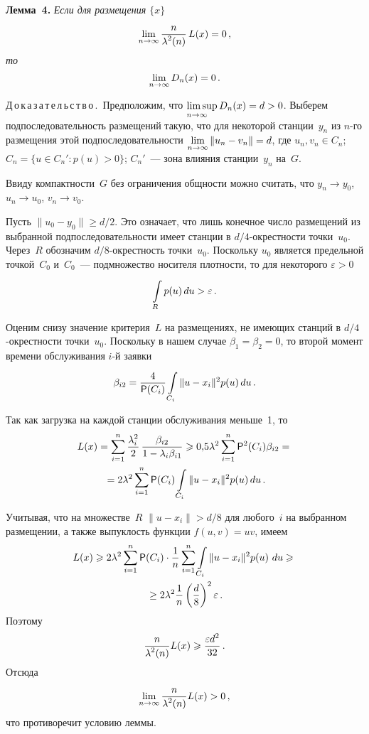 \begin{multicols}{2}
\medskip

\noindent
\textbf{Лемма~4.} \textit{Если для размещения $\{x\}$}
$$
\lim\limits_{n\rightarrow\infty} \displaystyle\frac{\displaystyle n\mathstrut}{\displaystyle \lambda^2(n)\mathstrut}\,L(x)=0\,,
$$ 
\textit{то}
$$
\lim\limits_{n\rightarrow\infty} D_n(x)=0\,.
$$

\smallskip

\noindent
Д\,о\,к\,а\,з\,а\,т\,е\,л\,ь\,с\,т\,в\,о\,.\ 
Предположим, что $\limsup\limits_{n \to \infty~~~} D_n(x)=d>0$. Выберем подпоследовательность размещений такую, 
что для некоторой станции~$y_n$ из $n$-го
размещения этой подпоследовательности $\lim\limits_{n\to\infty} \|u_n-v_n\|=d$, где $u_n, v_n \in C_n$;
$C_n=\{u\in C_n' : p(u)>0 \}$; $C_n'$~--- зона влияния станции~$y_n$ на~$G$.

Ввиду компактности~$G$ без ограничения общ\-ности можно считать, что $y_n \to y_0$, $u_n \to u_0$,
$v_n \to v_0 $.

Пусть $\|u_0 - y_0\|\geqslant d/2$. Это означает, что лишь конечное число размещений из
выбранной подпоследовательности имеет станции в $d/4$-окрестности точки~$u_0$. Через~$R$
обозначим $d/8$-окрестность точки~$u_0$.
%
Поскольку $u_0$ является предельной точкой~$C_0$ и~$C_0$~--- подмножество носителя плотности,
то для некоторого $\varepsilon>0$ 
$$
\int\limits_{R}^{}p(u)\,du > \varepsilon\,.
$$

Оценим снизу значение критерия~$L$ на размещениях, не имеющих станций в $d/4$-окрест\-ности
точки~$u_0$.
%
Поскольку в нашем случае $\beta_1=\beta_2=0$, то второй момент времени обслуживания $i$-й заявки 
$$
\beta_{i2}=\displaystyle\frac{\displaystyle 4\mathstrut}{\displaystyle {{\sf P}} (C_i)\mathstrut}\int\limits_{C_i}^{}\|u-x_i\|^2 p(u)\,du\,.
$$

Так как загрузка на каждой станции обслуживания меньше~1, то
\begin{multline*}
L(x)=\sum\limits_{i=1}^{n}\displaystyle\frac{\displaystyle \lambda_i^2\mathstrut}{\displaystyle 2\mathstrut} \,\displaystyle\frac{\displaystyle \beta_{i2}\mathstrut}{\displaystyle 1-\lambda_i \beta_{i1}\mathstrut}\geqslant
0{,}5\lambda^2\sum\limits_{i=1}^{n} {{\sf P}}^2(C_i)\beta_{i2}={}\\
{}=2\lambda^2\sum\limits_{i=1}^{n} {{\sf P}}(C_i)\int\limits_{C_i}^{}\|u-x_i\|^2 p(u)\,du\,.
\end{multline*}

Учитывая, что на множестве~$R$ $\|u-x_i\|>d/8$ для любого~$i$ на выбранном размещении, 
а также выпуклость функции $f(u,v)=u v$, имеем
\begin{multline*}
L(x)\geqslant 2\lambda^2\sum\limits_{i=1}^{n} {{\sf P}}(C_i)\cdot \displaystyle\frac{\displaystyle 1\mathstrut}{\displaystyle n\mathstrut}\sum\limits_{i=1}^{n}\int\limits_{C_i}^{}\|u-x_i\|^2 p(u)~du \geqslant{}\\
{}\geq 2\lambda^2 \displaystyle\frac{\displaystyle 1\mathstrut}{\displaystyle n\mathstrut}\left(\displaystyle\frac{\displaystyle d\mathstrut}{\displaystyle 8\mathstrut}\right)^2 \varepsilon\,.
\end{multline*}
Поэтому
$$
\displaystyle\frac{\displaystyle n\mathstrut}{\displaystyle \lambda^2(n)\mathstrut}L(x)\geqslant \displaystyle\frac{\displaystyle \varepsilon d^2\mathstrut}{\displaystyle 32\mathstrut}\,.
$$
Отсюда
$$
\lim\limits_{n\to\infty}\displaystyle\frac{\displaystyle n\mathstrut}{\displaystyle \lambda^2(n)\mathstrut}L(x)> 0\,,
$$
что противоречит условию леммы.


\end{multicols}

